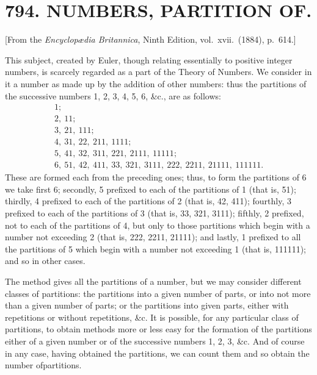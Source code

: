 \documentclass[11pt,a4paper]{article}
\theoremstyle{definition}
\begin{document}
\section*{794. NUMBERS, PARTITION OF.}

\begin{flushright}
\small[From the \textit{Encyclop{\ae}dia Britannica}, Ninth Edition, vol.~xvii.~(1884), p.~614.]
\end{flushright}

This subject, created by Euler, though relating essentially to positive integer numbers, is scarcely regarded as a part of the Theory of Numbers. We consider in it a number as made up by the addition of other numbers: thus the partitions of the successive numbers 1, 2, 3, 4, 5, 6, \&c., are as follows:
\begin{gather*}
1;\\
2,\ 11;\\
3,\ 21,\ 111;\\
4,\ 31,\ 22,\ 211,\ 1111;\\
5,\ 41,\ 32,\ 311,\ 221,\ 2111,\ 11111;\\
6,\ 51,\ 42,\ 411,\ 33,\ 321,\ 3111,\ 222,\ 2211,\ 21111,\ 111111.
\end{gather*}
These are formed each from the preceding ones; thus, to form the partitions of 6 we take first 6; secondly, 5 prefixed to each of the partitions of 1 (that is, 51); thirdly, 4 prefixed to each of the partitions of 2 (that is, 42, 411); fourthly, 3 prefixed to each of the partitions of 3 (that is, 33, 321, 3111); fifthly, 2 prefixed, not to each of the partitions of 4, but only to those partitions which begin with a number not exceeding 2 (that is, 222, 2211, 21111); and lastly, 1 prefixed to all the partitions of 5 which begin with a number not exceeding 1 (that is, 111111); and so in other cases.

The method gives all the partitions of a number, but we may consider different classes of partitions: the partitions into a given number of parts, or into not more than a given number of parts; or the partitions into given parts, either with repetitions or without repetitions, \&c. It is possible, for any particular class of partitions, to obtain methods more or less easy for the formation of the partitions either of a given number or of the successive numbers 1, 2, 3, \&c. And of course in any case, having obtained the partitions, we can count them and so obtain the number ofpartitions.
\end{document}
